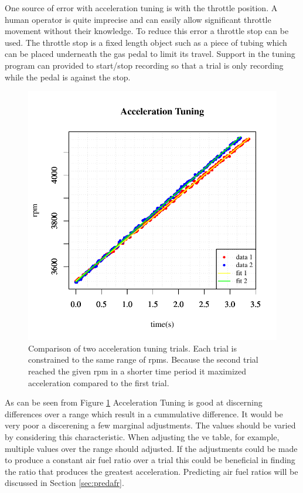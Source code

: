 \documentclass{article}
\begin{document}
One source of error with acceleration tuning is with the throttle position.
A human operator is quite imprecise and can easily allow significant
throttle movement without their knowledge.
To reduce this error a throttle stop can be used.
The throttle stop is a fixed length object such as a piece of tubing which
can be placed underneath the gas pedal to limit its travel.
Support in the tuning program can provided to start/stop recording so
that a trial is only recording while the pedal is against the stop.

\begin{figure}[!htbp]
\center
\includegraphics[scale=0.8]{msq-accel-4g_52cm_45-65mph-20110627-20:17:43-rtdata-single}
\caption{Comparison of two acceleration tuning trials.
Each trial is constrained to the same range of rpms.
Because the second trial reached the given rpm in a shorter time
period it maximized acceleration compared to the first trial.}
\label{fig:acctun}
\end{figure}

As can be seen from Figure \ref{fig:acctun} Acceleration Tuning is good
at discerning differences over a range which result in a cummulative
difference.
It would be very poor a discerening a few marginal adjustments.
The values should be varied by considering this characteristic.
When adjusting the ve table, for example, multiple values over the
range should adjusted.
If the adjustments could be made to produce a constant air fuel ratio
over a trial this could be beneficial in finding the ratio that produces
the greatest acceleration.
Predicting air fuel ratios will be discussed in Section \ref{sec:predafr}.
\end{document}
